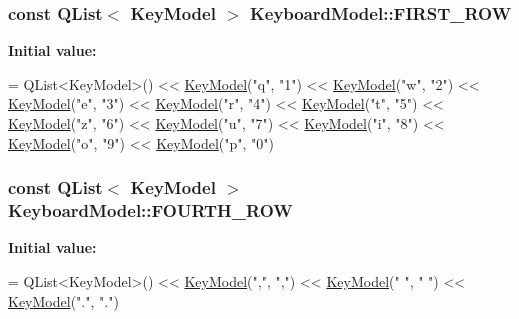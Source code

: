\subsubsection[{F\+I\+R\+S\+T\+\_\+\+R\+O\+W}]{\setlength{\rightskip}{0pt plus 5cm}const Q\+List$<$ {\bf Key\+Model} $>$ Keyboard\+Model\+::\+F\+I\+R\+S\+T\+\_\+\+R\+O\+W\hspace{0.3cm}{\ttfamily [static]}}\label{classKeyboardModel_a56682bd14da2f9b99672a72c8f0d403e}
{\bfseries Initial value\+:}
\begin{DoxyCode}
= QList<KeyModel>()
        << \hyperlink{structKeyModel}{KeyModel}(\textcolor{stringliteral}{"q"}, \textcolor{stringliteral}{"1"}) << \hyperlink{structKeyModel}{KeyModel}(\textcolor{stringliteral}{"w"}, \textcolor{stringliteral}{"2"}) << \hyperlink{structKeyModel}{KeyModel}(\textcolor{stringliteral}{"e"}, \textcolor{stringliteral}{"3"}) << 
      \hyperlink{structKeyModel}{KeyModel}(\textcolor{stringliteral}{"r"}, \textcolor{stringliteral}{"4"}) << \hyperlink{structKeyModel}{KeyModel}(\textcolor{stringliteral}{"t"}, \textcolor{stringliteral}{"5"})
        << \hyperlink{structKeyModel}{KeyModel}(\textcolor{stringliteral}{"z"}, \textcolor{stringliteral}{"6"}) << \hyperlink{structKeyModel}{KeyModel}(\textcolor{stringliteral}{"u"}, \textcolor{stringliteral}{"7"}) << \hyperlink{structKeyModel}{KeyModel}(\textcolor{stringliteral}{"i"}, \textcolor{stringliteral}{"8"}) << 
      \hyperlink{structKeyModel}{KeyModel}(\textcolor{stringliteral}{"o"}, \textcolor{stringliteral}{"9"}) << \hyperlink{structKeyModel}{KeyModel}(\textcolor{stringliteral}{"p"}, \textcolor{stringliteral}{"0"})
\end{DoxyCode}
\hypertarget{classKeyboardModel_afc29686df1a103c9f9f604f45677b123}{}
\subsubsection[{F\+O\+U\+R\+T\+H\+\_\+\+R\+O\+W}]{\setlength{\rightskip}{0pt plus 5cm}const Q\+List$<$ {\bf Key\+Model} $>$ Keyboard\+Model\+::\+F\+O\+U\+R\+T\+H\+\_\+\+R\+O\+W\hspace{0.3cm}{\ttfamily [static]}}\label{classKeyboardModel_afc29686df1a103c9f9f604f45677b123}
{\bfseries Initial value\+:}
\begin{DoxyCode}
= QList<KeyModel>()
        << \hyperlink{structKeyModel}{KeyModel}(\textcolor{stringliteral}{","}, \textcolor{stringliteral}{","}) << \hyperlink{structKeyModel}{KeyModel}(\textcolor{stringliteral}{" "}, \textcolor{stringliteral}{" "}) << \hyperlink{structKeyModel}{KeyModel}(\textcolor{stringliteral}{"."}, \textcolor{stringliteral}{"."})
\end{DoxyCode}
\hypertarget{classKeyboardModel_ac5bc6941290e1d02cdaee27d86d4c506}{}
